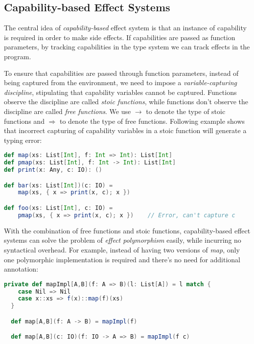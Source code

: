 \subsection{Capability-based Effect Systems}

The central idea of \emph{capability-based} effect system is that an
instance of capability is required in order to make side effects. If
capabilities are passed as function parameters, by tracking
capabilities in the type system we can track effects in the program.

To ensure that capabilities are passed through function parameters,
instead of being captured from the environment, we need to impose a
\emph{variable-capturing discipline}, stipulating that capability
variables cannot be captured. Functions observe the discipline are
called \emph{stoic functions}, while functions don't observe the
discipline are called \emph{free functions}. We use $\to$ to denote
the type of stoic functions and $\Rightarrow$ to denote the type of
free functions. Following example shows that incorrect capturing of
capability variables in a stoic function will generate a typing error:

\begin{lstlisting}[language=Scala]
def map(xs: List[Int], f: Int => Int): List[Int]
def pmap(xs: List[Int], f: Int -> Int): List[Int]
def print(x: Any, c: IO): ()

def bar(xs: List[Int])(c: IO) =
    map(xs, { x => print(x, c); x })

def foo(xs: List[Int], c: IO) =
    pmap(xs, { x => print(x, c); x })    // Error, can't capture c
\end{lstlisting}

With the combination of free functions and stoic functions,
capability-based effect systems can solve the problem of \emph{effect
  polymorphism} easily, while incurring no syntactical overhead. For
example, instead of having two versions of \emph{map}, only one
polymorphic implementation is required and there's no need for
additional annotation:

\begin{lstlisting}[language=Scala]
  private def mapImpl[A,B](f: A => B)(l: List[A]) = l match {
    case Nil => Nil
    case x::xs => f(x)::map(f)(xs)
  }

  def map[A,B](f: A -> B) = mapImpl(f)

  def map[A,B](c: IO)(f: IO -> A => B) = mapImpl(f c)
\end{lstlisting}


